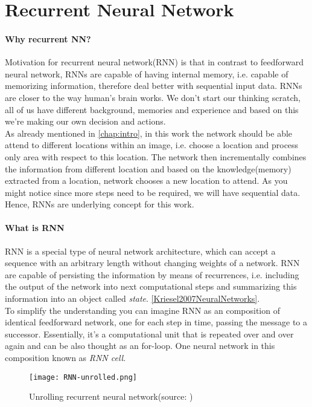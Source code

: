 \section{Recurrent Neural Network}

\paragraph{Why recurrent NN?} Motivation for recurrent neural network(RNN) is that
in contrast to feedforward neural network, RNNs are capable of having internal memory,
i.e. capable of memorizing information, therefore deal better with sequential input data.
RNNs are closer to the way human's brain works. We don't start our thinking scratch,
all of us have different background, memories and experience and based on this
we're making our own decision and actions. \\
As already mentioned in \autoref{chap:intro}, in this work
the network should be able attend to different locations within an image, i.e.
choose a location and process only area with respect to this location. The network then
incrementally combines the information from different location and based
on the knowledge(memory) extracted from a location, network chooses a new location to
attend. As you might notice since more steps need to be required, we will have sequential
data. Hence, RNNs are underlying concept for this work.

\paragraph{What is RNN} RNN is a special type of neural network architecture, which can
accept a sequence with an arbitrary length without changing weights of a network.
RNN are capable of persisting the information by means of recurrences, i.e. including
the output of the network into next computational steps and summarizing this information
into an object called \emph{state}.
 \ref{Kriesel2007NeuralNetworks}.
\\
To simplify the understanding you can imagine RNN as an composition of identical
feedforward network, one for each step in time, passing the message to a successor.
Essentially, it's a computational unit that is repeated over and over again and
can be also thought as an for-loop.
One neural network in this composition known as \emph{RNN cell}.

\begin{figure}[H]
	\texttt{[image: RNN-unrolled.png]}
	\caption{Unrolling recurrent neural network(source: \cite{ColahChristopher2015})}
	\label{img:rnn_unrolled}
\end{figure}

